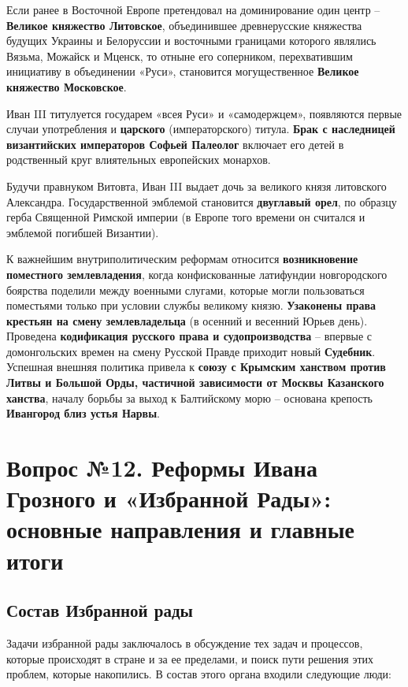 \documentclass{article}
\begin{document}
\hfill

Если ранее в Восточной Европе претендовал на доминирование один центр – \textbf{Великое княжество Литовское}, объединившее древнерусские княжества будущих Украины и Белоруссии и восточными границами которого являлись Вязьма, Можайск и Мценск, то отныне его соперником, перехватившим инициативу в объединении «Руси», становится могущественное \textbf{Великое княжество Московское}.

Иван III титулуется государем «всея Руси» и «самодержцем», появляются первые случаи употребления и \textbf{царского} (императорского) титула. \textbf{Брак с наследницей византийских императоров Софьей Палеолог} включает его детей в родственный круг влиятельных европейских монархов.

Будучи правнуком Витовта, Иван III выдает дочь за великого князя литовского Александра. Государственной эмблемой становится \textbf{двуглавый орел}, по образцу герба Священной Римской империи (в Европе того времени он считался и эмблемой погибшей Византии).

К важнейшим внутриполитическим реформам относится \textbf{возникновение поместного землевладения}, когда конфискованные латифундии новгородского боярства поделили между военными слугами, которые могли пользоваться поместьями только при условии службы великому князю. \textbf{Узаконены права крестьян на смену землевладельца} (в осенний и весенний Юрьев день). Проведена \textbf{кодификация русского права и судопроизводства} – впервые с домонгольских времен на смену Русской Правде приходит новый \textbf{Судебник}. Успешная внешняя политика привела к \textbf{союзу с Крымским ханством против Литвы и Большой Орды, частичной зависимости от Москвы Казанского ханства}, началу борьбы за выход к Балтийскому морю – основана крепость \textbf{Ивангород близ устья Нарвы}.

\pagebreak
\section{Вопрос №12. Реформы Ивана Грозного и «Избранной Рады»: основные направления и главные итоги}

\subsection{Состав Избранной рады}

Задачи избранной рады заключалось в обсуждение тех задач и процессов, которые происходят в стране и за ее пределами, и поиск пути решения этих проблем, которые накопились. В состав этого органа входили следующие люди:
\end{document}
